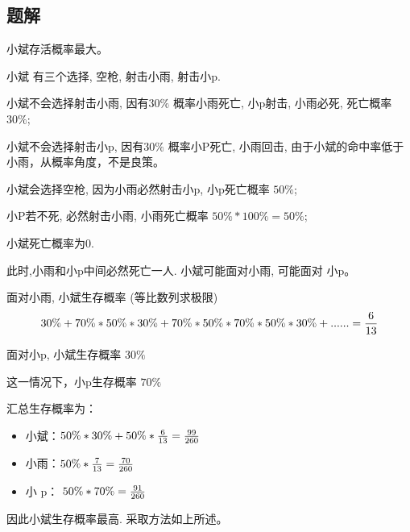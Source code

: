 \subsection{题解}
\begin{frame}
小斌存活概率最大。

小斌 有三个选择, 空枪, 射击小雨, 射击小p.

小斌不会选择射击小雨, 因有$30\%$ 概率小雨死亡, 小p射击, 小雨必死, 死亡概率 $30\%$;

小斌不会选择射击小p, 因有$30\%$ 概率小P死亡, 小雨回击, 由于小斌的命中率低于小雨，从概率角度，不是良策。

小斌会选择空枪, 因为小雨必然射击小p, 小p死亡概率 $50\%$;

小P若不死, 必然射击小雨, 小雨死亡概率 $50\% *100\% = 50\%$;

小斌死亡概率为0.
\end{frame}

\begin{frame}
此时,小雨和小p中间必然死亡一人.  小斌可能面对小雨, 可能面对 小p。

面对小雨, 小斌生存概率 (等比数列求极限)
$$30\% + 70\%*50\%*30\% + 70\%*50\%*70\%*50\%*30\% +...... = {6 \over 13}$$

面对小p,  小斌生存概率 $30\%$

这一情况下，小p生存概率 $70\%$
\end{frame}

\begin{frame}
汇总生存概率为：

\begin{itemize}
    \item 小斌：${50\%}*30\% +50\%*{6\over13} = {99\over 260}$
    \item 小雨：$50\%* {7\over13}= {70\over260}$
    \item 小 p： $50\%*70\%={91\over 260}$
\end{itemize}

因此小斌生存概率最高. 采取方法如上所述。
\end{frame}

